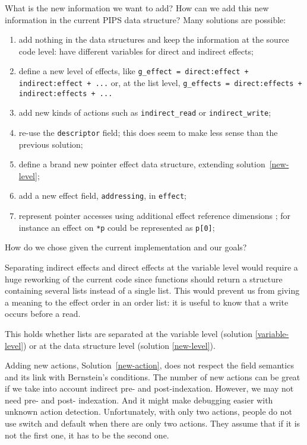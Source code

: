 \documentclass[a4paper]{report}
\begin{document}
What is the new information we want to add? How can we add this new
information in the current PIPS data structure? Many solutions are
possible:
\begin{enumerate}

\item \label{variable-level}add nothing in the data structures and
 keep the information at the source code level: have different
 variables for direct and indirect effects;

\item \label{new-level}define a new level of effects, like
\verb/g_effect = direct:effect + indirect:effect + .../ or, at the list
level, \verb/g_effects = direct:effects + indirect:effects + .../

\item \label{new-action}add new kinds of actions such as
 \verb/indirect_read/ or \verb/indirect_write/;

\item re-use the \verb/descriptor/ field; this does seem to make less
 sense than the previous solution;

\item \label{new-effect}define a brand new pointer effect data structure, extending
 solution~\ref{new-level};

\item \label{new-effect-field} add a new effect field, \verb/addressing/,
 in \verb/effect/;

\item \label{new-effect-reference-dimension} represent pointer accesses using additional effect reference dimensions ; for instance an effect on \verb/*p/ could be represented as \verb/p[0]/;

\end{enumerate}

How do we chose given the current implementation and our goals?

Separating indirect effects and direct effects at the variable level
 would require a huge reworking of the current code since functions
 should return a structure containing several lists instead of a
 single list. This would prevent us from giving a meaning to the
 effect order in an order list: it is useful to know that a write
 occurs before a read.

This holds whether lists are separated at the variable level (solution
 \ref{variable-level}) or at the data structure level (solution
 \ref{new-level}).

Adding new actions, Solution~\ref{new-action}, does not respect the
 field semantics and its link with Bernstein's conditions. The number of
 new actions can be great if we take into account indirect pre- and
 post-indexation. However, we may not need pre- and post-
 indexation. And it might make debugging easier with unknown action
 detection. Unfortunately, with only two actions, people do not use
 switch and default when there are only two actions. They assume that
 if it is not the first one, it has to be the second one.
\end{document}
